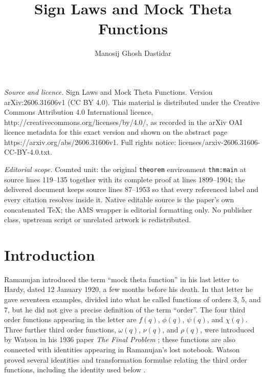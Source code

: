\documentclass[10pt,a4paper]{amsart}
\begin{document}
\title[Sign Laws and Mock Theta Functions]{Sign Laws and Mock Theta Functions}
\author{Manosij Ghosh Dastidar}
\date{}
\maketitle
\noindent\emph{Source and licence.} Sign Laws and Mock Theta Functions. Version arXiv:2606.31606v1 (CC BY 4.0). This material is distributed under the Creative Commons Attribution 4.0 International licence, http://creativecommons.org/licenses/by/4.0/, as recorded in the arXiv OAI licence metadata for this exact version and shown on the abstract page https://arxiv.org/abs/2606.31606v1. Full rights notice: licenses/arxiv-2606.31606-CC-BY-4.0.txt.\par\smallskip
\noindent\textit{Editorial scope.} Counted unit: the original \texttt{theorem} environment \texttt{thm:main} at source lines 119--135 together with its complete proof at lines 1899--1904; the delivered document keeps source lines 87--1953 so that every referenced label and every citation resolves inside it. Native editable source is the paper's own concatenated TeX; the AMS wrapper is editorial formatting only. No publisher class, upstream script or unrelated artwork is redistributed.
\section{Introduction}

Ramanujan introduced the term ``mock theta function'' in his last letter to Hardy, dated 12 January 1920, a few months before his death.  In that letter he gave seventeen examples, divided into what he called functions of orders $3$, $5$, and $7$, but he did not give a precise definition of the term ``order''.  The four third order functions appearing in the letter are $f(q)$, $\phi(q)$, $\psi(q)$, and $\chi(q)$.  Three further third order functions, $\omega(q)$, $\nu(q)$, and $\rho(q)$, were introduced by Watson in his 1936 paper \emph{The Final Problem} \cite{Watson}; these functions are also connected with identities appearing in Ramanujan's lost notebook.  Watson proved several identities and transformation formulae relating the third order functions, including the identity used below \cite{Watson,Zagier}.
\end{document}
